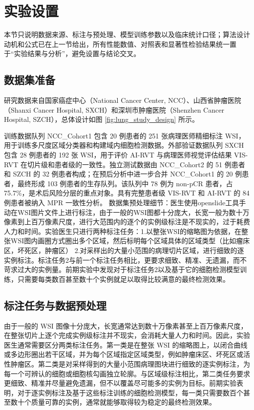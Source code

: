 \section{实验设置}
本节只说明数据来源、标注与预处理、模型训练参数以及临床统计口径；算法设计动机和公式已在上一节给出，所有性能数值、对照表和显著性检验结果统一置于“实验结果与分析”，避免设置与结论交叉。

\subsection{数据集准备}
研究数据来自国家癌症中心（National Cancer Center, NCC）、山西省肿瘤医院（Shanxi Cancer Hospital, SXCH）和深圳市肿瘤医院（Shenzhen Cancer Hospital, SZCH），总体设计如图 \ref{fig:lung_study_design} 所示。

训练数据队列 NCC\_Cohort1 包含 20 例患者的 251 张病理医师精细标注 WSI，用于训练多尺度区域分类器和构建域内细胞检测数据。外部验证数据队列 SXCH 包含 28 例患者的 192 张 WSI，用于评价 AI-RVT 与病理医师视觉评估结果 VIS-RVT 在切片级和患者级的一致性。独立测试数据由 NCC\_Cohort2 的 51 例患者和 SZCH 的 32 例患者构成；在预后分析中进一步合并 NCC\_Cohort1 的 20 例患者，最终形成 103 例患者的生存队列。该队列中 78 例为 non-pCR 患者，占 75.7\%，是术后风险分层的重点对象。具有完整患者级 VIS-RVT 和 AI-RVT 的 84 例患者被纳入 MPR 一致性分析。
数据集预处理细节：医生使用openslide工具手动在WSI图片文件上进行标注，由于一般的WSI图都十分庞大，长宽一般为数十万像素到上百万像素尺度，进行大范围内的逐个的实例级标注是不现实的，过于耗费人力和时间。实验医生只进行两种标注任务：1.以整张WSI的缩略图为依据，在整张WSI图内画圈方式圈出多个区域，然后标明每个区域具体的区域类型（比如瘤床区，坏死区，肿瘤区） 2.对采样出的大量小范围的病理切片区域，进行细致的逐实例标注。标注任务2与前一个标注任务相比，更要求细致、精准、无遗漏，而不苛求过大的实例量。前期实验中发现对于标注任务2以及基于它的细胞检测模型训练，只需要每类数百甚至数十个实例就足以取得比较满意的最终检测效果。

\subsection{标注任务与数据预处理}
由于一般的 WSI 图像十分庞大，长宽通常达到数十万像素甚至上百万像素尺度，在整张切片上逐个完成实例级标注并不现实，会消耗大量人力和时间。因此，实验医生通常需要区分两类标注任务。第一类是在整张 WSI 的缩略图上，以闭合曲线或多边形圈出若干区域，并为每个区域指定区域类型，例如肿瘤床区、坏死区或活性肿瘤区。第二类是对采样得到的大量小范围病理图块进行细致的逐实例标注，为每一个可辨认的细胞或细胞核勾画独立轮廓。与区域级标注相比，第二类任务要求更细致、精准并尽量避免遗漏，但不以覆盖尽可能多的实例为目标。前期实验表明，对于逐实例标注及基于这些标注训练的细胞检测模型，每一类只需要数百个甚至数十个质量可靠的实例，通常就能够取得较为稳定的最终检测效果。

